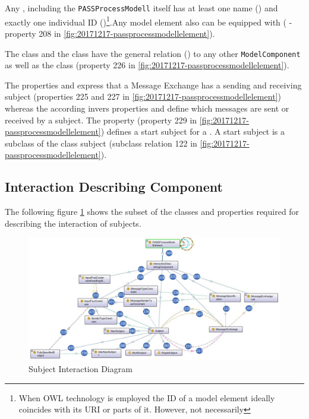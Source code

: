 Any , including the  \texttt{PASSProcessModell} itself has at least one name () and exactly one individual ID ()\footnote{When OWL technology is employed the ID of a model element ideally coincides with its URI or parts of it. However, not necessarily}.Any model element also can be equipped with  ( - property 208 in \ref{fig:20171217-passprocessmodellelement}). 

The class  and the class  have the general relation () to any other \texttt{ModelComponent} as well as the class  (property 226 in \ref{fig:20171217-passprocessmodellelement}). 

The properties  and  express that a Message Exchange has a sending and receiving subject (properties 225 and 227 in \ref{fig:20171217-passprocessmodellelement}) whereas the according invers properties  and  define which messages are sent or received by a subject. The property  (property 229 in \ref{fig:20171217-passprocessmodellelement}) defines a start subject for a . A start subject is a subclass of the class subject (subclass relation 122 in \ref{fig:20171217-passprocessmodellelement}).


\subsection{Interaction Describing Component}

The following figure \ref{fig:ontogrsubjectinteraction} shows the subset of the classes and properties required for describing the interaction of subjects. 

\begin{figure}[htbp]
	\centering
	\includegraphics[width=1.0\linewidth]{Figures/Ontology/SubjectInteraction/OntoGrSubjectInteraction}
	\caption[Subject Interaction Diagram]{Subject Interaction Diagram}
	\label{fig:ontogrsubjectinteraction}
\end{figure}


